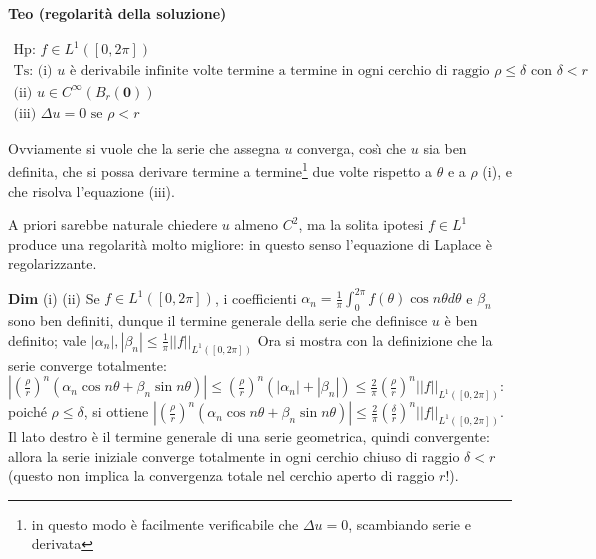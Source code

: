 \documentclass{article}
\begin{document}
\textbf{Teo (regolarit\`{a} della soluzione)}

\begin{gather*}
\text{Hp: }f\in L^{1}\left( \left[ 0,2\pi \right] \right) \\
\text{Ts: (i) }u\text{ \`{e} derivabile infinite volte termine a termine in
ogni cerchio di raggio }\rho \leq \delta \text{ con }\delta <r \\
\text{(ii) }u\in C^{\infty }\left( B_{r}\left( \mathbf{0}\right) \right) \\
\text{(iii) }\Delta u=0\text{ se }\rho <r
\end{gather*}

Ovviamente si vuole che la serie che assegna $u$ converga, cos\`{\i} che $u$
sia ben definita, che si possa derivare termine a termine\footnote{%
in questo modo \`{e} facilmente verificabile che $\Delta u=0$, scambiando
serie e derivata} due volte rispetto a $\theta $ e a $\rho $ (i), e che
risolva l'equazione (iii).

A priori sarebbe naturale chiedere $u$ almeno $C^{2}$, ma la solita ipotesi $%
f\in L^{1}$ produce una regolarit\`{a} molto migliore: in questo senso
l'equazione di Laplace \`{e} regolarizzante.

\textbf{Dim} (i) (ii) Se $f\in L^{1}\left( \left[ 0,2\pi \right] \right) $,
i coefficienti $\alpha _{n}=\frac{1}{\pi }\int_{0}^{2\pi }f\left( \theta
\right) \cos n\theta d\theta $ e $\beta _{n}$ sono ben definiti, dunque il
termine generale della serie che definisce $u$ \`{e} ben definito; vale $%
\left\vert \alpha _{n}\right\vert ,\left\vert \beta _{n}\right\vert \leq 
\frac{1}{\pi }\left\vert \left\vert f\right\vert \right\vert _{L^{1}\left( %
\left[ 0,2\pi \right] \right) }$ Ora si mostra con la definizione che la
serie converge totalmente: $\left\vert \left( \frac{\rho }{r}\right)
^{n}\left( \alpha _{n}\cos n\theta +\beta _{n}\sin n\theta \right)
\right\vert \leq \left( \frac{\rho }{r}\right) ^{n}\left( \left\vert \alpha
_{n}\right\vert +\left\vert \beta _{n}\right\vert \right) \leq \frac{2}{\pi }%
\left( \frac{\rho }{r}\right) ^{n}\left\vert \left\vert f\right\vert
\right\vert _{L^{1}\left( \left[ 0,2\pi \right] \right) }$: poich\'{e} $\rho
\leq \delta $, si ottiene $\left\vert \left( \frac{\rho }{r}\right)
^{n}\left( \alpha _{n}\cos n\theta +\beta _{n}\sin n\theta \right)
\right\vert \leq \frac{2}{\pi }\left( \frac{\delta }{r}\right)
^{n}\left\vert \left\vert f\right\vert \right\vert _{L^{1}\left( \left[
0,2\pi \right] \right) }$. Il lato destro \`{e} il termine generale di una
serie geometrica, quindi convergente: allora la serie iniziale converge
totalmente in ogni cerchio chiuso di raggio $\delta <r$ (questo non implica
la convergenza totale nel cerchio aperto di raggio $r$!).
\end{document}
